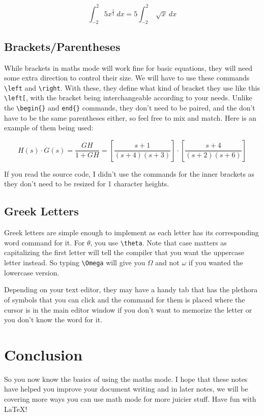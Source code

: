 \documentclass[12pt, a4paper]{article}
\begin{document}
				$$\int^2_{-2}5x^{\frac{1}{2}}\ dx = 5\int^2_{-2}\sqrt[]{x}\ dx$$
				
			
			\subsection{Brackets/Parentheses}
				While brackets in maths mode will work fine for basic equations, they will need some extra direction to control their size. We will have to use these commands \verb|\left| and \verb|\right|. With these, they define what kind of bracket they use like this \verb|\left[|, with the bracket being interchangeable according to your needs. Unlike the \verb|\begin{}| and \verb|end{}| commands, they don't need to be paired, and the don't have to be the same parentheses either, so feel free to mix and match. Here is an example of them being used:
				
				$$H(s)\cdot G(s) = \frac{GH}{1 + GH} = \left[\frac{s+1}{(s+4)(s+3)}\right]\cdot\left[\frac{s+4}{(s+2)(s+6)}\right]$$
				
				If you read the source code, I didn't use the commands for the inner brackets as they don't need to be resized for 1 character heights.
				
			\subsection{Greek Letters}
				Greek letters are simple enough to implement as each letter has its corresponding word command for it. For $\theta$, you use \verb|\theta|. Note that case matters as capitalizing the first letter will tell the compiler that you want the uppercase letter instead. So typing \verb|\Omega| will give you $\Omega$ and not $\omega$ if you wanted the lowercase version.
				
				Depending on your text editor, they may have a handy tab that has the plethora of symbols that you can click and the command for them is placed where the cursor is in the main editor window if you don't want to memorize the letter or you don't know the word for it.
				
		\section{Conclusion}
			So you now know the basics of using the maths mode. I hope that these notes have helped you improve your document writing and in later notes, we will be covering more ways you can use math mode for more juicier stuff. Have fun with \LaTeX !

		
\end{document}
